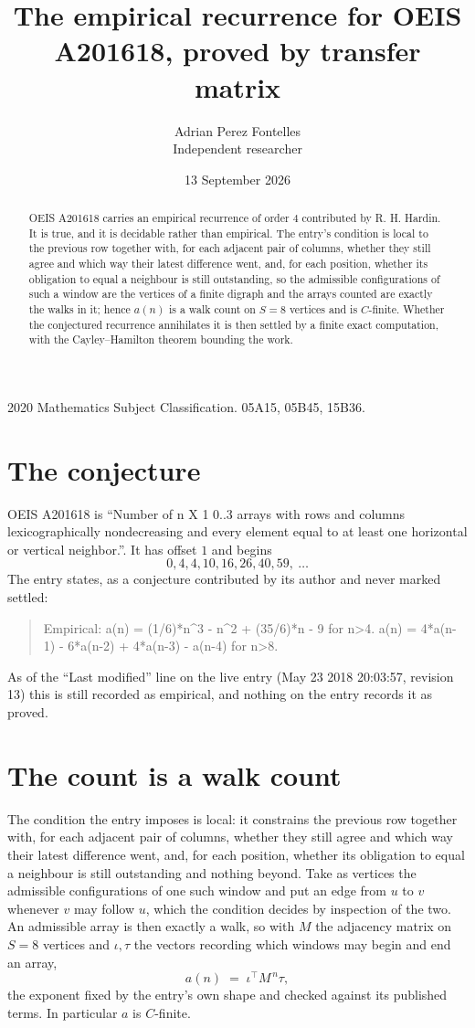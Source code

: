 \documentclass[11pt,a4paper]{article}
\title{The empirical recurrence for OEIS A201618, proved by transfer matrix}
\author{Adrian Perez Fontelles\\ \small Independent researcher}
\date{13 September 2026}
\theoremstyle{plain}
\theoremstyle{definition}
\begin{document}
\maketitle

\begin{abstract}
OEIS A201618 carries an empirical recurrence of order $4$ contributed by R. H. Hardin. It is
true, and it is decidable rather than empirical. The entry's condition is local to the previous row together with, for each adjacent pair of columns, whether they still agree and which way their latest difference went, and, for each position, whether its obligation to equal a neighbour is still outstanding, so
the admissible configurations of such a window are the vertices of a finite digraph and the
arrays counted are exactly the walks in it; hence $a(n)$ is a walk count on $S=8$ vertices
and is $C$-finite. Whether the conjectured recurrence annihilates it is then settled by a
finite exact computation, with the Cayley--Hamilton theorem bounding the work.
\end{abstract}

\noindent\small 2020 Mathematics Subject Classification. 05A15, 05B45, 15B36.\normalsize

\section{The conjecture}

OEIS A201618 is ``Number of n X 1 0..3 arrays with rows and columns lexicographically nondecreasing and every element equal to at least one horizontal or vertical neighbor.''. It has offset $1$ and begins
\[
0, 4, 4, 10, 16, 26, 40, 59,\ \dots
\]
The entry states, as a conjecture contributed by its author and never marked settled:
\begin{quote}
Empirical: a(n) = (1/6)*n\^{}3 - n\^{}2 + (35/6)*n - 9 for n>4. a(n) = 4*a(n-1) - 6*a(n-2) + 4*a(n-3) - a(n-4) for n>8.
\end{quote}
As of the ``Last modified'' line on the live entry (May 23 2018 20:03:57, revision 13) this is still
recorded as empirical, and nothing on the entry records it as proved.

\section{The count is a walk count}

The condition the entry imposes is local: it constrains the previous row together with, for each adjacent pair of columns, whether they still agree and which way their latest difference went, and, for each position, whether its obligation to equal a neighbour is still outstanding and nothing beyond. Take as
vertices the admissible configurations of one such window and put an edge from $u$ to $v$
whenever $v$ may follow $u$, which the condition decides by inspection of the two. An
admissible array is then exactly a walk, so with $M$ the adjacency matrix on $S=8$ vertices
and $\iota,\tau$ the vectors recording which windows may begin and end an array,
\[
a(n)\;=\;\iota^{\!\top}M^{\,n}\tau ,
\]
the exponent fixed by the entry's own shape and checked against its published terms. In
particular $a$ is $C$-finite.
\end{document}
